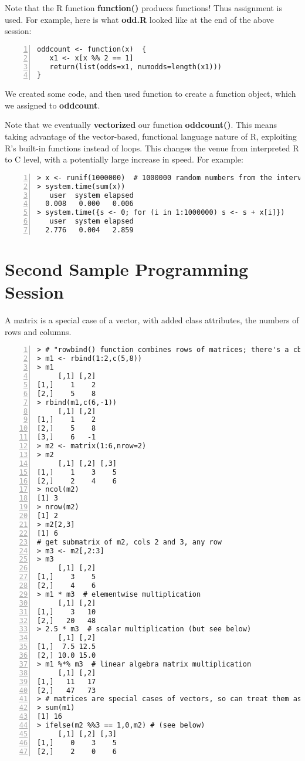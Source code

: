 Note that the R function {\bf function()} produces functions! Thus
assignment is used. For example, here is what {\bf odd.R} looked like at
the end of the above session:

\begin{lstlisting}[numbers=left]
oddcount <- function(x)  {
   x1 <- x[x %% 2 == 1]
   return(list(odds=x1, numodds=length(x1)))
}
\end{lstlisting}
  
We created some code, and then used function to create a function
object, which we assigned to {\bf oddcount}.

Note that we eventually {\bf vectorized} our function {\bf oddcount()}.
This means taking advantage of the vector-based, functional language
nature of R, exploiting R's built-in functions instead of loops.  This
changes the venue from interpreted R to C level, with a potentially
large increase in speed.  For example:

\begin{lstlisting}[numbers=left]
> x <- runif(1000000)  # 1000000 random numbers from the interval (0,1)
> system.time(sum(x))
   user  system elapsed 
  0.008   0.000   0.006 
> system.time({s <- 0; for (i in 1:1000000) s <- s + x[i]})
   user  system elapsed 
  2.776   0.004   2.859 
\end{lstlisting}

\section{Second Sample Programming Session}

A matrix is a special case of a vector, with added class attributes,
the numbers of rows and columns.

\begin{lstlisting}[numbers=left]
> # "rowbind() function combines rows of matrices; there's a cbind() too
> m1 <- rbind(1:2,c(5,8))
> m1
     [,1] [,2]
[1,]    1    2
[2,]    5    8
> rbind(m1,c(6,-1))
     [,1] [,2]
[1,]    1    2
[2,]    5    8
[3,]    6   -1
> m2 <- matrix(1:6,nrow=2)
> m2
     [,1] [,2] [,3]
[1,]    1    3    5
[2,]    2    4    6
> ncol(m2)
[1] 3
> nrow(m2)
[1] 2
> m2[2,3]
[1] 6
# get submatrix of m2, cols 2 and 3, any row
> m3 <- m2[,2:3]
> m3
     [,1] [,2]
[1,]    3    5
[2,]    4    6
> m1 * m3  # elementwise multiplication
     [,1] [,2]
[1,]    3   10
[2,]   20   48
> 2.5 * m3  # scalar multiplication (but see below)
     [,1] [,2]
[1,]  7.5 12.5
[2,] 10.0 15.0
> m1 %*% m3  # linear algebra matrix multiplication
     [,1] [,2]
[1,]   11   17
[2,]   47   73
> # matrices are special cases of vectors, so can treat them as vectors 
> sum(m1)
[1] 16
> ifelse(m2 %%3 == 1,0,m2) # (see below)
     [,1] [,2] [,3]
[1,]    0    3    5
[2,]    2    0    6
\end{lstlisting}


